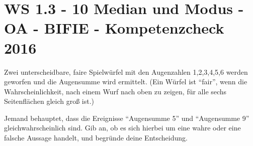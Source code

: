 \section{WS 1.3 - 10 Median und Modus - OA - BIFIE - Kompetenzcheck 2016}

\begin{beispiel}[WS 1.3]{1} %
				Zwei unterscheidbare, faire Spielwürfel mit den Augenzahlen 1,2,3,4,5,6 werden geworfen und die Augensumme wird ermittelt. (Ein Würfel ist "`fair"', wenn die Wahrscheinlichkeit, nach einem Wurf nach oben zu zeigen, für alle sechs Seitenflächen gleich groß ist.)

Jemand behauptet, dass die Ereignisse "`Augensumme 5"' und "`Augensumme 9"' gleichwahrscheinlich sind. Gib an, ob es sich hierbei um eine wahre oder eine falsche Aussage handelt, und begründe deine Entscheidung.\\

\end{beispiel}
